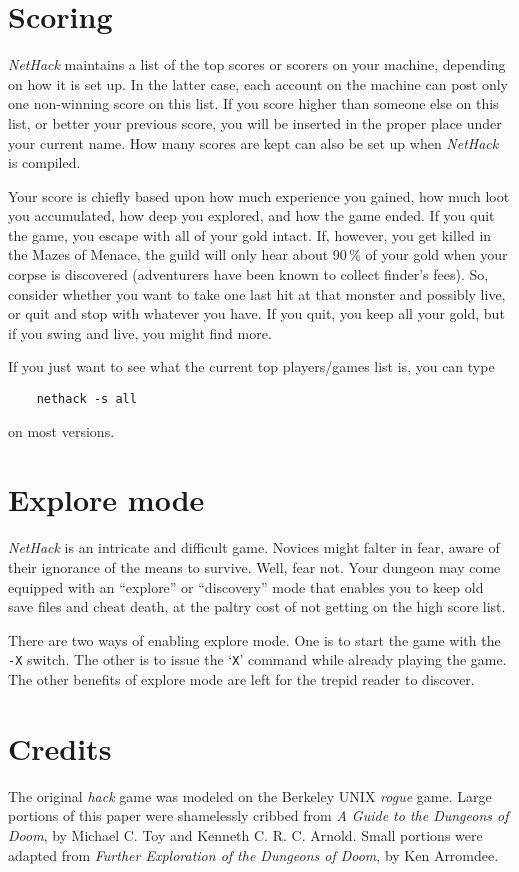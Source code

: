 \section{Scoring}

{\it NetHack\/} maintains a list of the top scores or scorers on your machine,
depending on how it is set up.  In the latter case, each account on
the machine can post only one non-winning score on this list.  If
you score higher than someone else on this list, or better your
previous score, you will be inserted in the proper place under your
current name.  How many scores are kept can also be set up when
{\it NetHack\/} is compiled.

Your score is chiefly based upon how much experience you gained, how
much loot you accumulated, how deep you explored, and how the game
ended.  If you quit the game, you escape with all of your gold intact.
If, however, you get killed in the Mazes of Menace, the guild will
only hear about 90\,\% of your gold when your corpse is discovered
(adventurers have been known to collect finder's fees).  So, consider
whether you want to take one last hit at that monster and possibly
live, or quit and stop with whatever you have.  If you quit, you keep
all your gold, but if you swing and live, you might find more.

If you just want to see what the current top players/games list is, you
can type
\begin{verbatim}
    nethack -s all
\end{verbatim}
on most versions.

\section{Explore mode}

{\it NetHack\/} is an intricate and difficult game.  Novices might falter
in fear, aware of their ignorance of the means to survive.  Well, fear
not.  Your dungeon may come equipped with an ``explore'' or ``discovery''
mode that enables you to keep old save files and cheat death, at the
paltry cost of not getting on the high score list.

There are two ways of enabling explore mode.  One is to start the game
with the {\tt -X}
switch.  The other is to issue the `{\tt X}' command while already playing
the game.  The other benefits of explore mode are left for the trepid
reader to discover.

\section{Credits}
The original %
{\it hack\/} game was modeled on the Berkeley
UNIX
{\it rogue\/} game.  Large portions of this paper were shamelessly
cribbed from %
{\it A Guide to the Dungeons of Doom}, by Michael C. Toy
and Kenneth C. R. C. Arnold.  Small portions were adapted from
{\it Further Exploration of the Dungeons of Doom}, by Ken Arromdee.

